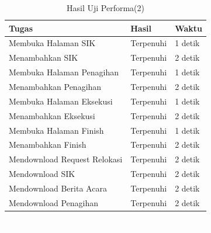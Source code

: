 \begin{table}
\centering
\begin{tabular}{|p{5cm}|p{2.5cm}|p{2cm}|}
\hline
\textbf{Tugas} & \textbf{Hasil} & \textbf{Waktu}\\ \hline
Membuka Halaman SIK & Terpenuhi & 1 detik\\ \hline
Menambahkan SIK & Terpenuhi & 2 detik\\ \hline
Membuka Halaman Penagihan & Terpenuhi & 1 detik\\ \hline
Menambahkan Penagihan & Terpenuhi & 2 detik\\ \hline
Membuka Halaman Eksekusi & Terpenuhi & 1 detik\\ \hline
Menambahkan Eksekusi & Terpenuhi & 2 detik\\ \hline
Membuka Halaman Finish & Terpenuhi & 1 detik\\ \hline
Menambahkan Finish & Terpenuhi & 2 detik\\ \hline
Mendownload Request Relokasi & Terpenuhi & 2 detik\\ \hline
Mendownload SIK & Terpenuhi & 2 detik\\ \hline
Mendownload Berita Acara & Terpenuhi & 2 detik\\ \hline
Mendownload Penagihan & Terpenuhi & 2 detik\\ \hline
\end{tabular}\caption{Hasil Uji Performa(2)}
		\label{tab:evaluasi_performa_2}
\end{table}

\vspace{4 cm}
\textcolor{white}{..}